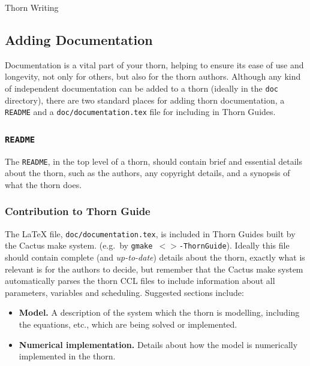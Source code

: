 \begin{cactuspart}{Thorn Writing}

\subsection{Adding Documentation}
\label{sec:Adding_documentation}

Documentation is a vital part of your thorn, helping to ensure its
ease of use and longevity, not only for others, but also for the thorn
authors.  Although any kind of independent documentation can be added
to a thorn (ideally in the \texttt{doc} directory), there are two
standard places for adding thorn documentation, a \texttt{README} and a
\texttt{doc/documentation.tex} file for including in Thorn Guides.

\subsubsection{\texttt{README}}

The \texttt{README}, in the top level of a thorn, should contain brief
and essential details about the thorn, such as the authors, any
copyright details, and a synopsis of what the thorn does.

\subsubsection{Contribution to Thorn Guide}

The LaTeX file, \texttt{doc/documentation.tex}, is included in Thorn Guides
built by the Cactus make system. (e.g.\ by \texttt{gmake
$<$$>$-ThornGuide}). Ideally this file should contain complete
(and \textit{up-to-date}) details about the thorn, exactly what is
relevant is for the authors to decide, but remember that the Cactus
make system automatically parses the thorn CCL files to include
information about all parameters, variables and scheduling. Suggested
sections include:

\begin{itemize}

  \item{\bf Model.} A description of the system which the thorn is modelling,
    including the equations, etc., which are being solved or implemented.

  \item{\bf Numerical implementation.} Details about how the model is
    numerically implemented in the thorn.


\end{itemize}
\end{cactuspart}
